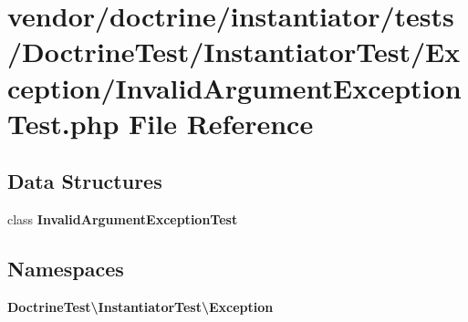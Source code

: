 \section{vendor/doctrine/instantiator/tests/\+Doctrine\+Test/\+Instantiator\+Test/\+Exception/\+Invalid\+Argument\+Exception\+Test.php File Reference}
\label{_invalid_argument_exception_test_8php}
\subsection*{Data Structures}
\begin{DoxyCompactItemize}
\item 
class {\bf Invalid\+Argument\+Exception\+Test}
\end{DoxyCompactItemize}
\subsection*{Namespaces}
\begin{DoxyCompactItemize}
\item 
 {\bf Doctrine\+Test\textbackslash{}\+Instantiator\+Test\textbackslash{}\+Exception}
\end{DoxyCompactItemize}
